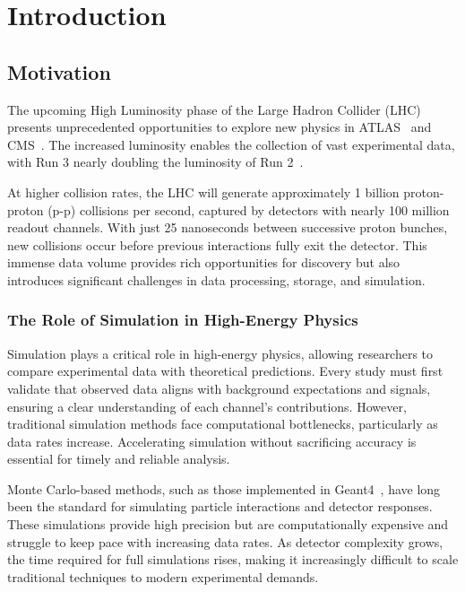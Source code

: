 
\chapter{Introduction}
\section{Motivation}

The upcoming High Luminosity phase of the Large Hadron Collider (LHC)~\cite{LHC_machine_2008} presents unprecedented opportunities to explore new physics in ATLAS~\cite{collaboration_atlas_2008} and CMS~\cite{CMS_2008}. The increased luminosity enables the collection of vast experimental data, with Run 3 nearly doubling the luminosity of Run 2~\cite{Future_LHC}.

At higher collision rates, the LHC will generate approximately 1 billion proton-proton (p-p) collisions per second, captured by detectors with nearly 100 million readout channels. With just 25 nanoseconds between successive proton bunches, new collisions occur before previous interactions fully exit the detector. This immense data volume provides rich opportunities for discovery but also introduces significant challenges in data processing, storage, and simulation.

\subsection{The Role of Simulation in High-Energy Physics}

Simulation plays a critical role in high-energy physics, allowing researchers to compare experimental data with theoretical predictions. Every study must first validate that observed data aligns with background expectations and signals, ensuring a clear understanding of each channel’s contributions. However, traditional simulation methods face computational bottlenecks, particularly as data rates increase. Accelerating simulation without sacrificing accuracy is essential for timely and reliable analysis.

Monte Carlo-based methods, such as those implemented in Geant4~\cite{Geant4}, have long been the standard for simulating particle interactions and detector responses. These simulations provide high precision but are computationally expensive and struggle to keep pace with increasing data rates. As detector complexity grows, the time required for full simulations rises, making it increasingly difficult to scale traditional techniques to modern experimental demands.


